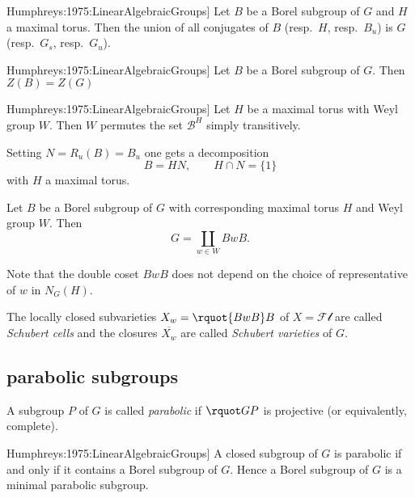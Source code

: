 \documentclass[english, no-theorem-numbers]{short-notes}
\newcommand\Humph[1]{\cite[#1]{Humphreys:1975:LinearAlgebraicGroups}}
\begin{document}
\begin{Thm}[\Humph{Thm~22.2}]
    Let $B$ be a Borel subgroup of $G$ and $H$ a maximal torus.
    Then the union of all conjugates of $B$ (resp.~$H$, resp.~$B_u$) is $G$ (resp.~$G_s$, resp.~$G_u$).
\end{Thm}

\begin{Prop}[\Humph{Cor.~22.2B}]
    Let $B$ be a Borel subgroup of $G$.
    Then $Z(B) = Z(G)$
\end{Prop}

\begin{Prop}[\Humph{Prop.~24.1A}]
    Let $H$ be a maximal torus with Weyl group $W$.
    Then $W$ permutes the set $\mathcal B^H$ simply transitively.
\end{Prop}

Setting $N = R_u(B) = B_u$ one gets a decomposition
\[
    B = HN, \qquad H∩N = \{1\}
\]
with $H$ a maximal torus.

\begin{Thm}
    Let $B$ be a Borel subgroup of $G$ with corresponding maximal torus $H$ and Weyl group $W$.
    Then
    \[
        G = \coprod_{w ∈ W} BwB.
    \]
\end{Thm}

Note that the double coset $BwB$ does not depend on the choice of representative of $w$ in $N_G(H)$.

\begin{Def}
    The locally closed subvarieties $X_w = \rquot{BwB}B$ of $X = \mathcal{Fl}$ are called \emph{Schubert cells} and the closures $\overline{X_w}$ are called \emph{Schubert varieties} of $G$.
\end{Def}

\subsection*{parabolic subgroups}

\begin{Def}
    A subgroup $P$ of $G$ is called \emph{parabolic} if $\rquot GP$ is projective (or equivalently, complete).
\end{Def}

\begin{Prop}[\Humph{Cor.~21.3B}]
    A closed subgroup of $G$ is parabolic if and only if it contains a Borel subgroup of $G$.
    Hence a Borel subgroup of $G$ is a minimal parabolic subgroup.
\end{Prop}
\end{document}

